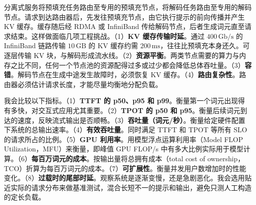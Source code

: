 \begin{interview}
分离式服务将预填充任务路由至专用的预填充节点，将解码任务路由至专用的解码节点。请求到达路由器后，先发往预填充节点，由它执行提示的前向传播并产生 KV 缓存。缓存随后经 RDMA 或 InfiniBand 传给解码节点，后者生成词元直至请求结束。这样做面临几项工程挑战。（1）\textbf{KV 缓存传输时延}。通过 \(400\,\mathrm{Gb/s}\) 的 InfiniBand 链路传输 \(10\,\mathrm{GB}\) 的 KV 缓存约需 \(200\,\mathrm{ms}\)，往往比预填充本身还久。可逐层传输 KV 块，与解码形成流水线。（2）\textbf{资源平衡}。两类节点需要的算力与内存之比不同，任何一个节点池的资源配得过多或过少都会降低总体吞吐量。（3）\textbf{容错}。解码节点在生成中途发生故障时，必须恢复 KV 缓存。（4）\textbf{路由复杂性}。路由器必须估计请求长度，才能尽量均衡地分配负载。

我会比较以下指标。（1）\textbf{TTFT 的 p50、p95 和 p99}。衡量第一个词元出现得有多快，对交互式应用尤其重要。（2）\textbf{TPOT 的 p50 和 p95}。衡量后续词元到达的速度，反映流式输出是否顺畅。（3）\textbf{吞吐量（词元/秒）}。衡量给定硬件配置下系统的总输出速率。（4）\textbf{有效吞吐量}。同时满足 TTFT 和 TPOT 等所有 SLO 的请求所占的比例。（5）\textbf{GPU 利用率}。用模型浮点运算利用率（Model FLOP Utilization，MFU）来衡量，即峰值 GPU FLOP/s 中有多大比例实际用于模型计算。（6）\textbf{每百万词元的成本}。按输出量将总拥有成本（total cost of ownership，TCO）折算为每百万词元的成本。（7）\textbf{可扩展性}。衡量并发用户数增加时的性能变化。（8）\textbf{过载时的尾部时延}。观察系统是逐渐变慢，还是急剧恶化。我会选用贴近实际的请求分布来做基准测试，混合长短不一的提示和输出，避免只测人工构造的定长负载。
\end{interview}
